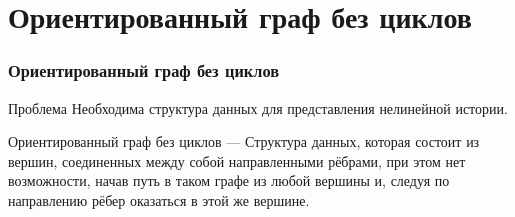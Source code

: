 \section{Ориентированный граф без циклов}
\begin{frame}
	\frametitle{Ориентированный граф без циклов}
	
	\begin{block}{Проблема}
		Необходима структура данных для представления нелинейной истории.
	\end{block}		
	
	\begin{mydef}
	\alert{Ориентированный граф без циклов} --- Структура данных, которая состоит из вершин, соединенных между собой направленными рёбрами,
	при этом нет возможности, начав путь в таком графе из любой вершины и, следуя по направлению
	рёбер оказаться в этой же вершине.	
	\end{mydef}
\end{frame}
